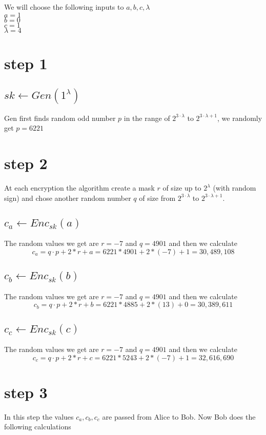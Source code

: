 \documentclass{article}
\begin{document}
We will choose the following inputs to $a,b,c,\lambda$\\
$a=1$\\
$b=0$\\
$c=1$\\
$\lambda = 4$

\section{step 1}
\subsection*{$sk\leftarrow Gen(1^\lambda)$}
Gen first finds random odd number $p$ in the range of $2^{3\cdot\lambda}$ to $2^{3\cdot\lambda+1}$, we randomly get $p=6221$
\section{step 2}
At each encryption the algorithm create a mask $r$ of size up to $2^{\lambda}$ (with random sign) and chose another random number $q$ of size from $2^{3\cdot\lambda}$ to $2^{3\cdot\lambda+1}$.
\subsection*{$c_a \leftarrow Enc_{sk}(a)$}
The random values we get are $r=-7$ and $q=4901$ and then we calculate 
\[
c_a = q\cdot p + 2*r + a = 6221*4901 + 2 * (-7) + 1
    = 30,489,108
\]
\subsection*{$c_b \leftarrow Enc_{sk}(b)$}
The random values we get are $r=-7$ and $q=4901$ and then we calculate 
\[
c_b = q\cdot p + 2*r + b = 6221*4885 + 2 * (13) + 0
    = 30,389,611
\]

\subsection*{$c_c \leftarrow Enc_{sk}(c)$}
The random values we get are $r=-7$ and $q=4901$ and then we calculate 
\[
c_c = q\cdot p + 2*r + c = 6221*5243 + 2 * (-7) + 1
    = 32,616,690
\]

\section{step 3}
In this step the values $c_a,c_b,c_c$ are passed from Alice to Bob. Now Bob does the following calculations
\end{document}
